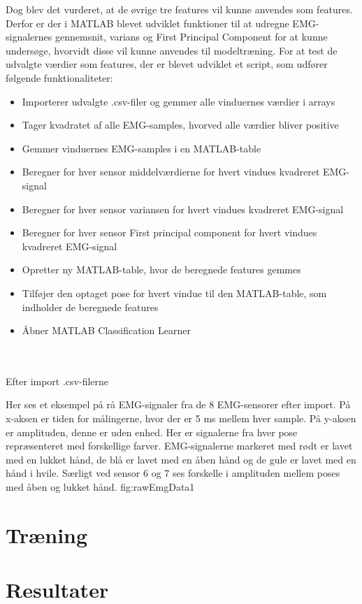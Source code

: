 Dog blev det vurderet, at de øvrige tre features vil kunne anvendes som features. Derfor er der i MATLAB blevet udviklet funktioner til at udregne EMG-signalernes gennemsnit, varians og First Principal Component for at kunne undersøge, hvorvidt disse vil kunne anvendes til modeltræning. 
For at test de udvalgte værdier som features, der er blevet udviklet et script, som udfører følgende funktionaliteter:
\begin{itemize}
\item Importerer udvalgte .csv-filer og gemmer alle vinduernes værdier i arrays
\item Tager kvadratet af alle EMG-samples, hvorved alle værdier bliver positive
\item Gemmer vinduernes EMG-samples i en MATLAB-table
\item Beregner for hver sensor middelværdierne for hvert vindues kvadreret EMG-signal
\item Beregner  for hver sensor variansen for hvert vindues kvadreret EMG-signal
\item Beregner  for hver sensor First principal component for hvert vindues kvadreret EMG-signal
\item Opretter ny MATLAB-table, hvor de beregnede features gemmes
\item Tilføjer den optaget pose for hvert vindue til den MATLAB-table, som indholder de beregnede features
\item Åbner MATLAB Classification Learner
\end{itemize}\\\\
Efter import .csv-filerne


{
	Her ses et eksempel på rå EMG-signaler fra de 8 EMG-sensorer efter import. På x-aksen er tiden for målingerne, hvor der er 5 ms mellem hver sample. På y-aksen er amplituden, denne er uden enhed. Her er signalerne fra hver pose repræsenteret med forskellige farver. EMG-signalerne markeret med rødt er lavet med en lukket hånd, de blå er lavet med en åben hånd og de gule er lavet med en hånd i hvile. Særligt ved sensor 6 og 7 ses forskelle i amplituden mellem poses med åben og lukket hånd. 
 }{fig:rawEmgData}{1} 

\section{Træning}

\section{Resultater}